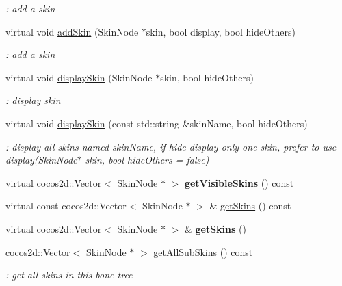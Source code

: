 \begin{DoxyCompactItemize}
\begin{DoxyCompactList}\small\item\em \+: add a skin \end{DoxyCompactList}\item 
virtual void \hyperlink{classBoneNode_a2e4e12608df751791f7239dcc3f0dd36}{add\+Skin} (Skin\+Node $\ast$skin, bool display, bool hide\+Others)
\begin{DoxyCompactList}\small\item\em \+: add a skin \end{DoxyCompactList}\item 
virtual void \hyperlink{classBoneNode_a7de62b37d7028948f09435c839ab3d9b}{display\+Skin} (Skin\+Node $\ast$skin, bool hide\+Others)
\begin{DoxyCompactList}\small\item\em \+: display skin \end{DoxyCompactList}\item 
virtual void \hyperlink{classBoneNode_a809d5e743bf5003db0421bdeaeeb1925}{display\+Skin} (const std\+::string \&skin\+Name, bool hide\+Others)
\begin{DoxyCompactList}\small\item\em \+: display all skins named skin\+Name, if hide display only one skin, prefer to use display(Skin\+Node$\ast$ skin, bool hide\+Others = false) \end{DoxyCompactList}\item 
\mbox{\label{classBoneNode_af7bf03b01031edeb991e062d5f1b8f39}} 
virtual cocos2d\+::\+Vector$<$ Skin\+Node $\ast$ $>$ {\bfseries get\+Visible\+Skins} () const
\item 
virtual const cocos2d\+::\+Vector$<$ Skin\+Node $\ast$ $>$ \& \hyperlink{classBoneNode_ad1e49b0e034dc298bcc8cf349c820584}{get\+Skins} () const
\item 
\mbox{\label{classBoneNode_a47d9df0dd30de267b857e7e630298d4a}} 
virtual cocos2d\+::\+Vector$<$ Skin\+Node $\ast$ $>$ \& {\bfseries get\+Skins} ()
\item 
\mbox{\label{classBoneNode_aad6cfe85d9bce00f728a8a5780f213e3}} 
cocos2d\+::\+Vector$<$ Skin\+Node $\ast$ $>$ \hyperlink{classBoneNode_aad6cfe85d9bce00f728a8a5780f213e3}{get\+All\+Sub\+Skins} () const
\begin{DoxyCompactList}\small\item\em \+: get all skins in this bone tree \end{DoxyCompactList}\item 

\end{DoxyCompactItemize}
